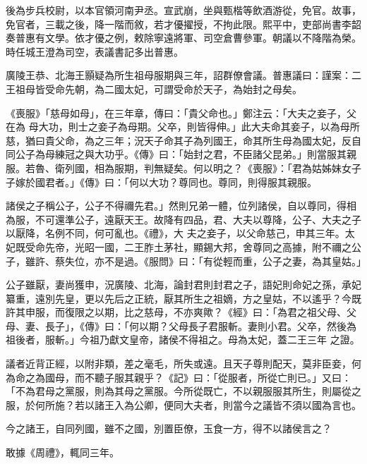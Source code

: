 \begin{pinyinscope}
 後為步兵校尉，以本官領河南尹丞。宣武崩，坐與甄楷等飲酒游從，免官。故事，免官者，三載之後，降一階而敘，若才優擢授，不拘此限。熙平中，吏部尚書李韶奏普惠有文學。依才優之例，敕除寧遠將軍、司空倉曹參軍。朝議以不降階為榮。時任城王澄為司空，表議書記多出普惠。



 廣陵王恭、北海王顥疑為所生祖母服期與三年，詔群僚會議。普惠議曰：謹案：二王祖母皆受命先朝，為二國太妃，可謂受命於天子，為始封之母矣。



 《喪服》「慈母如母」，在三年章，傳曰：「貴父命也。」鄭注云：「大夫之妾子，父在為
 母大功，則士之妾子為母期。父卒，則皆得伸。」此大夫命其妾子，以為母所慈，猶曰貴父命，為之三年；況天子命其子為列國王，命其所生母為國太妃，反自同公子為母練冠之與大功乎。《傳》曰：「始封之君，不臣諸父昆弟。」則當服其親服。若魯、衛列國，相為服期，判無疑矣。何以明之？《喪服》：「君為姑姊妹女子子嫁於國君者。」《傳》曰：「何以大功？尊同也。尊同，則得服其親服。



 諸侯之子稱公子，公子不得禰先君。」然則兄弟一體，位列諸侯，自以尊同，得相為服，不可還準公子，遠厭天王。故降有四品，君、大夫以尊降，公子、大夫之子以厭降，名例不同，何可亂也。《禮》，大
 夫之妾子，以父命慈己，申其三年。太妃既受命先帝，光昭一國，二王胙土茅社，顯錫大邦，舍尊同之高據，附不禰之公子，雖許、蔡失位，亦不是過。《服問》曰：「有從輕而重，公子之妻，為其皇姑。」



 公子雖厭，妻尚獲申，況廣陵、北海，論封君則封君之子，語妃則命妃之孫，承妃纂重，遠別先皇，更以先后之正統，厭其所生之祖嫡，方之皇姑，不以遙乎？今既許其申服，而復限之以期，比之慈母，不亦爽歟？《經》曰：「為君之祖父母、父母、妻、長子」，《傳》曰：「何以期？父母長子君服斬。妻則小君。父卒，然後為祖後者，服斬。」今祖乃獻文皇帝，諸侯不得祖之。母為太妃，蓋二王三年
 之證。



 議者近背正經，以附非類，差之毫毛，所失或遠。且天子尊則配天，莫非臣妾，何為命之為國母，而不聽子服其親乎？《記》曰：「從服者，所從亡則已。」又曰：「不為君母之黨服，則為其母之黨服。今所從既亡，不以親服服其所生，則屬從之服，於何所施？若以諸王入為公卿，便同大夫者，則當今之議皆不須以國為言也。



 今之諸王，自同列國，雖不之國，別置臣僚，玉食一方，得不以諸侯言之？



 敢據《周禮》，輒同三年。




\end{pinyinscope}
